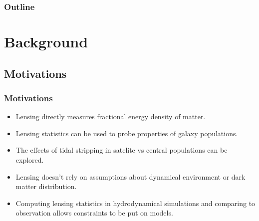 \documentclass{beamer}
\title{\color{oxblue}{\sc{Stripped Down Cluster Galaxies with Gravitational Lensing}}}
\subtitle{\sc{Part III Presentation}}
\author{\sc{Joe Winterburn}}
\institute{\sc{Institute of Astronomy}}
\date{}
\begin{document}
  \begin{frame}
    \titlepage
  \end{frame}

  \begin{frame}
    \frametitle{\sc Outline}
    \tableofcontents
  \end{frame}

  \section{Background}

  \subsection{Motivations}

  \begin{frame}
    \frametitle{Motivations}
    \begin{itemize}
      \item Lensing directly measures fractional energy density of matter.
      \item Lensing statistics can be used to probe properties of galaxy populations.
      \item The effects of tidal stripping in satelite vs central populations can be explored.
      \item Lensing doesn't rely on assumptions about dynamical environment or dark matter distribution.
      \item Computing lensing statistics in hydrodynamical simulations and comparing to observation allows constraints to be put on models.
    \end{itemize}
  \end{frame}
\end{document}
